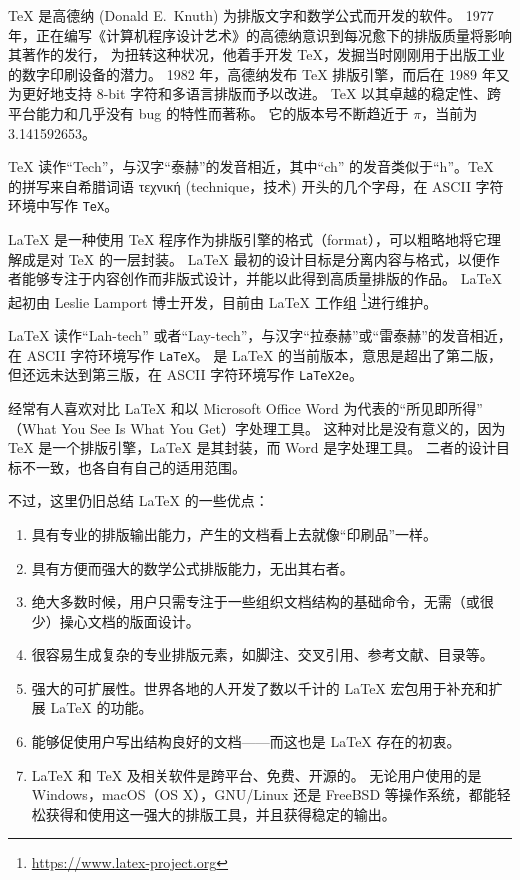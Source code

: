 \label{chap:intro}


\bisubsection{\TeX{}}{\TeX{}}

\TeX{} 是高德纳 (Donald E.~Knuth) 为排版文字和数学公式而开发的软件。
1977 年，正在编写《计算机程序设计艺术》的高德纳意识到每况愈下的排版质量将影响其著作的发行，
为扭转这种状况，他着手开发 \TeX{}，发掘当时刚刚用于出版工业的数字印刷设备的潜力。
1982 年，高德纳发布 \TeX{} 排版引擎，而后在 1989 年又为更好地支持 8-bit 字符和多语言排版而予以改进。
\TeX{} 以其卓越的稳定性、跨平台能力和几乎没有 bug 的特性而著称。
它的版本号不断趋近于 $\pi$，当前为 3.141592653。

\TeX{} 读作“Tech”，与汉字“泰赫”的发音相近，其中“ch” 的发音类似于“h”。\TeX{} 的拼写来自希腊词语
τεχνική (technique，技术) 开头的几个字母，在 ASCII 字符环境中写作 \texttt{TeX}。

\bisubsection{\LaTeX{}}{\LaTeX{}}

\LaTeX{} 是一种使用 \TeX{} 程序作为排版引擎的格式（format），可以粗略地将它理解成是对 \TeX{} 的一层封装。
\LaTeX{} 最初的设计目标是分离内容与格式，以便作者能够专注于内容创作而非版式设计，并能以此得到高质量排版的作品。
\LaTeX{} 起初由 Leslie Lamport 博士开发，目前由 \LaTeX{} 工作组%
\footnote{\url{https://www.latex-project.org}}进行维护。

\LaTeX{} 读作“Lah-tech” 或者“Lay-tech”，与汉字“拉泰赫”或“雷泰赫”的发音相近，在 ASCII 字符环境写作 \texttt{LaTeX}。
\LaTeXe{} 是 \LaTeX{} 的当前版本，意思是超出了第二版，但还远未达到第三版，在 ASCII 字符环境写作 \texttt{LaTeX2e}。


经常有人喜欢对比 \LaTeX{} 和以 Microsoft Office Word 为代表的“所见即所得”%
（What You See Is What You Get）字处理工具。
这种对比是没有意义的，因为 \TeX{} 是一个排版引擎，\LaTeX{} 是其封装，而 Word 是字处理工具。
二者的设计目标不一致，也各自有自己的适用范围。

不过，这里仍旧总结 \LaTeX{} 的一些优点：

\begin{enumerate}
\item 具有专业的排版输出能力，产生的文档看上去就像“印刷品”一样。
\item 具有方便而强大的数学公式排版能力，无出其右者。
\item 绝大多数时候，用户只需专注于一些组织文档结构的基础命令，无需（或很少）操心文档的版面设计。
\item 很容易生成复杂的专业排版元素，如脚注、交叉引用、参考文献、目录等。
\item 强大的可扩展性。世界各地的人开发了数以千计的 \LaTeX{} 宏包用于补充和扩展 \LaTeX{} 的功能。
\item 能够促使用户写出结构良好的文档——而这也是 \LaTeX{} 存在的初衷。
\item \LaTeX{} 和 \TeX{} 及相关软件是跨平台、免费、开源的。
无论用户使用的是 Windows，macOS（OS X），GNU/Linux 还是 FreeBSD 等操作系统，都能轻松获得和使用这一强大的排版工具，并且获得稳定的输出。
\end{enumerate}

